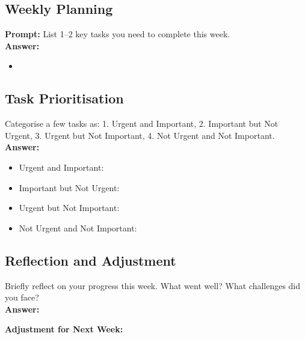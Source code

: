 \documentclass[a4paper,12pt]{article}
\begin{document}
\subsection*{Weekly Planning}
\textbf{Prompt:} List 1–2 key tasks you need to complete this week.\\
\textbf{Answer:}
\begin{itemize}
    \item 
\end{itemize}

\subsection*{Task Prioritisation}
 Categorise a few tasks as: 1. Urgent and Important, 2. Important but Not Urgent, 3. Urgent but Not Important, 4. Not Urgent and Not Important.\\
\textbf{Answer:}
\begin{itemize}
    \item Urgent and Important: 
    \item Important but Not Urgent: 
    \item Urgent but Not Important: 
    \item Not Urgent and Not Important: 
\end{itemize}

\subsection*{Reflection and Adjustment}
Briefly reflect on your progress this week. What went well? What challenges did you face?\\
\textbf{Answer:} 

\noindent
\textbf{Adjustment for Next Week:} 
\end{document}
